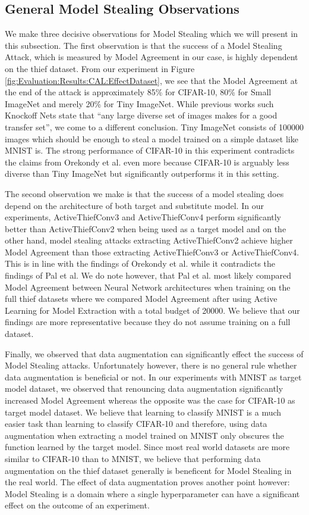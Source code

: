 \subsection{General Model Stealing Observations}
\label{sec:Discussion:ModelStealing:General}
We make three decisive observations for Model Stealing which we will present in this subsection. The first observation is that the success of a Model Stealing Attack, which is measured by Model Agreement in our case, is highly dependent on the thief dataset. From our experiment in 
Figure \ref{fig:Evaluation:Results:CAL:EffectDataset}, we see that the Model Agreement at the end of the attack is approximately 85\% for CIFAR-10, 80\% for Small ImageNet and merely 20\% for Tiny ImageNet. While previous works such Knockoff Nets state that \enquote{any large diverse set
of images makes for a good transfer set}, we come to a different conclusion. Tiny ImageNet consists of 100000 images which should be enough to steal a model trained on a simple dataset like MNIST is. The strong performance of CIFAR-10 in this experiment contradicts the claims from
Orekondy et al. even more because CIFAR-10 is arguably less diverse than Tiny ImageNet but significantly outperforms it in this setting. \par
The second observation we make is that the success of a model stealing does depend on the architecture of both target and substitute model. In our experiments, ActiveThiefConv3 and ActiveThiefConv4 perform significantly better than ActiveThiefConv2 when being used as a target model
and on the other hand, model stealing attacks extracting ActiveThiefConv2 achieve higher Model Agreement than those extracting ActiveThiefConv3 or ActiveThiefConv4. This is in line with the findings of Orekondy et al. while it contradicts the findings of Pal et al. We do note however,
that Pal et al. most likely compared Model Agreement between Neural Network architectures when training on the full thief datasets where we compared Model Agreement after using Active Learning for Model Extraction with a total budget of 20000. We believe that our findings are more
representative because they do not assume training on a full dataset. \par
Finally, we observed that data augmentation can significantly effect the success of Model Stealing attacks. Unfortunately however, there is no general rule whether data augmentation is beneficial or not. In our experiments with MNIST as target model dataset, we observed that
renouncing data augmentation significantly increased Model Agreement whereas the opposite was the case for CIFAR-10 as target model dataset. We believe that learning to classify MNIST is a much easier task than learning to classify CIFAR-10 and therefore, using data augmentation
when extracting a model trained on MNIST only obscures the function learned by the target model. Since most real world datasets are more similar to CIFAR-10 than to MNIST, we believe that performing data augmentation on the thief dataset generally is beneficent for Model Stealing
in the real world. The effect of data augmentation proves another point however: Model Stealing is a domain where a single hyperparameter can have a significant effect on the outcome of an experiment.

